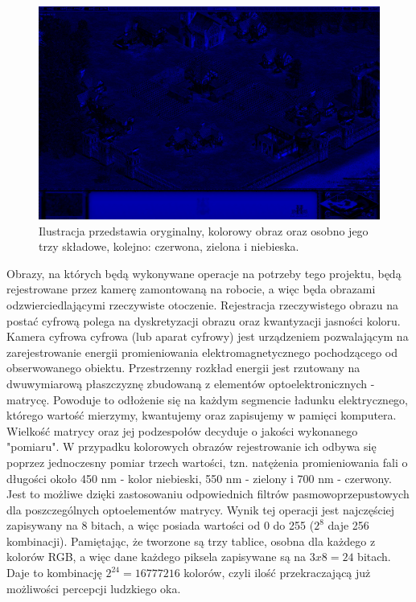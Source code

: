\begin{figure}[H]
\begin{center}
\includegraphics[scale=0.2]{imgs/blue.jpg}
\caption[Rozbicie obrazu kolorowego na RGB.]{\small{Ilustracja przedstawia oryginalny, kolorowy obraz oraz osobno jego trzy składowe, kolejno: czerwona, zielona i niebieska.}\footnotemark}
\label{rgb}
\end{center}
\end{figure}

Obrazy, na których będą wykonywane operacje na potrzeby tego projektu, będą rejestrowane przez kamerę zamontowaną na robocie, a więc będa obrazami odzwierciedlającymi rzeczywiste otoczenie. Rejestracja rzeczywistego obrazu na postać cyfrową polega na dyskretyzacji obrazu oraz kwantyzacji jasności koloru\cite{Malina}. Kamera cyfrowa cyfrowa (lub aparat cyfrowy) jest urządzeniem pozwalającym na zarejestrowanie energii promieniowania elektromagnetycznego pochodzącego od obserwowanego obiektu. Przestrzenny rozkład energii jest rzutowany na dwuwymiarową płaszczyznę zbudowaną z elementów optoelektronicznych - matrycę. Powoduje to odłożenie się na każdym segmencie ładunku elektrycznego, którego wartość mierzymy, kwantujemy oraz zapisujemy w pamięci komputera. Wielkość matrycy oraz jej podzespołów decyduje o jakości wykonanego "pomiaru". W przypadku kolorowych obrazów rejestrowanie ich odbywa się poprzez jednoczesny pomiar trzech wartości, tzn. natężenia promieniowania fali o długości około 450 nm - kolor niebieski, 550 nm - zielony i 700 nm - czerwony. Jest to możliwe dzięki zastosowaniu odpowiednich filtrów pasmowoprzepustowych dla poszczególnych optoelementów matrycy.
Wynik tej operacji jest najczęściej zapisywany na 8 bitach, a więc posiada wartości od 0 do 255 ($2^8$ daje 256 kombinacji). Pamiętając, że tworzone są trzy tablice, osobna dla każdego z kolorów RGB, a więc dane każdego piksela zapisywane są na $3 x 8 = 24$ bitach. Daje to kombinację $2^{24} = 16777216$ kolorów, czyli ilość przekraczającą już możliwości percepcji ludzkiego oka.

